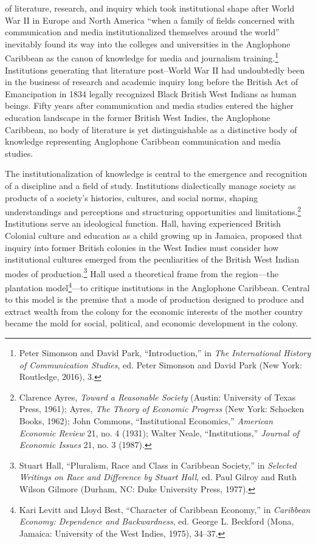 \documentclass{tufte-handout}
\begin{document}
 of literature, research, and inquiry which took
institutional shape after World War II in Europe and North America
``when a family of fields concerned with communication and media
institutionalized themselves around the world'' inevitably found its way
into the colleges and universities in the Anglophone Caribbean as the
canon of knowledge for media and journalism training.\footnote{Peter
  Simonson and David Park, ``Introduction,'' in \emph{The International
  History of Communication Studies}, ed. Peter Simonson and David Park
  (New York: Routledge, 2016), 3.} Institutions generating that
literature post--World War II had undoubtedly been in the business of
research and academic inquiry long before the British Act of
Emancipation in 1834 legally recognized Black British West Indians as
human beings. Fifty years after communication and media studies entered
the higher education landscape in the former British West Indies, the
Anglophone Caribbean, no body of literature is yet distinguishable as a
distinctive body of knowledge representing Anglophone Caribbean
communication and media studies.

The institutionalization of knowledge is central to the emergence and
recognition of a discipline and a field of study. Institutions
dialectically manage society as products of a society's histories,
cultures, and social norms, shaping understandings and perceptions and
structuring opportunities and limitations.\footnote{Clarence Ayres,
  \emph{Toward a Reasonable Society} (Austin: University of Texas Press,
  1961); Ayres, \emph{The Theory of Economic Progress} (New York:
  Schocken Books, 1962); John Commons, ``Institutional Economics,''
  \emph{American Economic Review} 21, no. 4 (1931); Walter Neale,
  ``Institutions,'' \emph{Journal of Economic Issues} 21, no. 3 (1987).}
Institutions serve an ideological function. Hall, having experienced
British Colonial culture and education as a child growing up in Jamaica,
proposed that inquiry into former British colonies in the West Indies
must consider how institutional cultures emerged from the peculiarities
of the British West Indian modes of production.\footnote{Stuart Hall,
  ``Pluralism, Race and Class in Caribbean Society,'' in \emph{Selected
  Writings on Race and Difference by Stuart Hall}, ed. Paul Gilroy and
  Ruth Wilson Gilmore (Durham, NC: Duke University Press, 1977).} Hall
used a theoretical frame from the region---the plantation
model\footnote{Kari Levitt and Lloyd Best, ``Character of Caribbean
  Economy,'' in \emph{Caribbean Economy: Dependence and Backwardness},
  ed. George L. Beckford (Mona, Jamaica: University of the West Indies,
  1975), 34--37.}---to critique institutions in the Anglophone
Caribbean. Central to this model is the premise that a mode of
production designed to produce and extract wealth from the colony for
the economic interests of the mother country became the mold for social,
political, and economic development in the colony.
\end{document}
